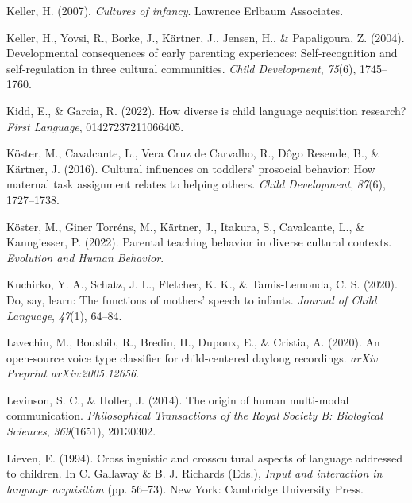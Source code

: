 \documentclass[
  man,floatsintext]{apa6}
\newlength{\cslhangindent}
\newlength{\cslentryspacingunit} %
\newenvironment{CSLReferences}[2] %
 {%
  \setlength{\parindent}{0pt}
  \ifodd #1
  \let\oldpar\par
  \def\par{\hangindent=\cslhangindent\oldpar}
  \fi
  \setlength{\parskip}{#2\cslentryspacingunit}
 }%
 {}
\begin{document}
\begin{CSLReferences}{1}{0}
\leavevmode{}%
Keller, H. (2007). \emph{Cultures of infancy}. Lawrence Erlbaum Associates.

\leavevmode{}%
Keller, H., Yovsi, R., Borke, J., Kärtner, J., Jensen, H., \& Papaligoura, Z. (2004). Developmental consequences of early parenting experiences: Self-recognition and self-regulation in three cultural communities. \emph{Child Development}, \emph{75}(6), 1745--1760.

\leavevmode{}%
Kidd, E., \& Garcia, R. (2022). How diverse is child language acquisition research? \emph{First Language}, 01427237211066405.

\leavevmode{}%
Köster, M., Cavalcante, L., Vera Cruz de Carvalho, R., Dôgo Resende, B., \& Kärtner, J. (2016). Cultural influences on toddlers' prosocial behavior: How maternal task assignment relates to helping others. \emph{Child Development}, \emph{87}(6), 1727--1738.

\leavevmode{}%
Köster, M., Giner Torréns, M., Kärtner, J., Itakura, S., Cavalcante, L., \& Kanngiesser, P. (2022). Parental teaching behavior in diverse cultural contexts. \emph{Evolution and Human Behavior}.

\leavevmode{}%
Kuchirko, Y. A., Schatz, J. L., Fletcher, K. K., \& Tamis-Lemonda, C. S. (2020). Do, say, learn: The functions of mothers' speech to infants. \emph{Journal of Child Language}, \emph{47}(1), 64--84.

\leavevmode{}%
Lavechin, M., Bousbib, R., Bredin, H., Dupoux, E., \& Cristia, A. (2020). An open-source voice type classifier for child-centered daylong recordings. \emph{arXiv Preprint arXiv:2005.12656}.

\leavevmode{}%
Levinson, S. C., \& Holler, J. (2014). The origin of human multi-modal communication. \emph{Philosophical Transactions of the Royal Society B: Biological Sciences}, \emph{369}(1651), 20130302.

\leavevmode{}%
Lieven, E. (1994). Crosslinguistic and crosscultural aspects of language addressed to children. In C. Gallaway \& B. J. Richards (Eds.), \emph{Input and interaction in language acquisition} (pp. 56--73). New York: Cambridge University Press.


\end{CSLReferences}
\end{document}
